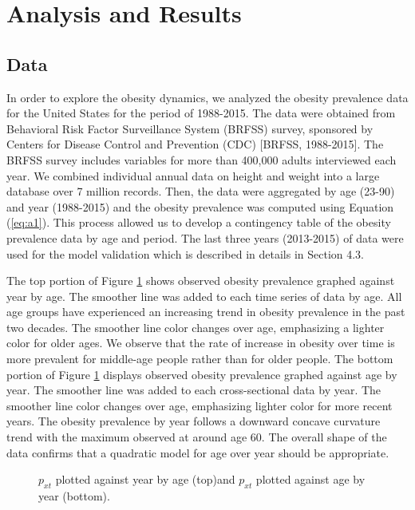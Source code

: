 \documentclass[11pt,letterpaper]{article}
\numberwithin{equation}{section}
\begin{document}
\section{Analysis and Results}\label{sec:results}
\subsection{Data}
In order to explore the obesity dynamics, we analyzed the obesity prevalence data for the United States for the period of 1988-2015. The data were obtained from Behavioral Risk Factor Surveillance System (BRFSS) survey, sponsored by Centers for Disease Control and Prevention (CDC) [BRFSS, 1988-2015]. The BRFSS survey includes variables for more than 400,000 adults interviewed each year.  We combined individual annual data on height and weight into a large database over 7 million records. Then, the data were aggregated by age (23-90) and year (1988-2015) and the obesity prevalence was computed using Equation (\ref{eq:a1}). This process allowed us to develop a contingency table of the obesity prevalence data by age and period. The last three years (2013-2015) of data were used for the model validation which is described in details in Section 4.3.

The top portion of Figure \ref{fig:plot1} shows observed obesity prevalence graphed against year by age. The smoother line was added to each time series of data by age. All age groups have experienced an increasing trend in obesity prevalence in the past two decades. The smoother line color changes over age, emphasizing a lighter color for older ages. We observe that the rate of increase in obesity over time is more prevalent for middle-age people rather than for older people.
The bottom portion of Figure \ref{fig:plot1} displays observed obesity prevalence graphed against age by year. The smoother line was added to each cross-sectional data by year. The smoother line color changes over age, emphasizing lighter color for more recent years. The obesity prevalence by year follows a downward concave curvature trend with the maximum observed at around age 60. The overall shape of the data confirms that a quadratic model for age over year should be appropriate.


\begin{figure}
\begin{center}
{}
{}
\caption{\label{fig:plot1} $p_{xt}$ plotted against year by age (top)and $p_{xt}$ plotted against age  by year (bottom).}
\end{center}
\end{figure}
\end{document}
